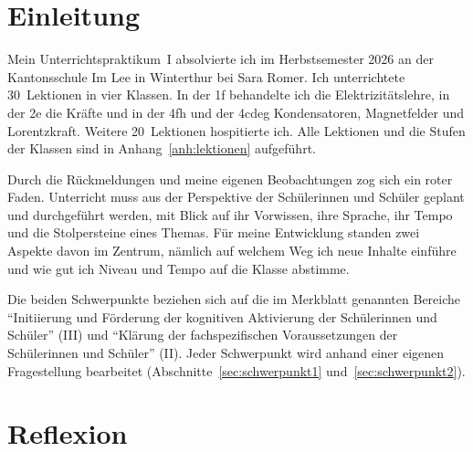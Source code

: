 \documentclass[12pt,a4paper]{article}
\newcommand{\Lehrperson}{Sara Romer}
\begin{document}
\setcounter{page}{2}
\begin{singlespace}
\tableofcontents
\end{singlespace}
\thispagestyle{empty}
\clearpage
{}

\section{Einleitung}

Mein Unterrichtspraktikum~I absolvierte ich im Herbstsemester 2026 an der
Kantonsschule Im Lee in Winterthur bei \Lehrperson. Ich unterrichtete
30~Lektionen in vier Klassen. In der 1f behandelte ich die
Elektrizitätslehre, in der 2e die Kräfte und in der 4fh und der 4cdeg
Kondensatoren, Magnetfelder und Lorentzkraft. Weitere 20~Lektionen hospitierte ich. Alle Lektionen und
die Stufen der Klassen sind in Anhang~\ref{anh:lektionen} aufgeführt.

Durch die Rückmeldungen und meine eigenen Beobachtungen zog sich ein roter
Faden. Unterricht muss aus der Perspektive der Schülerinnen und Schüler geplant
und durchgeführt werden, mit Blick auf ihr Vorwissen, ihre Sprache, ihr Tempo
und die Stolpersteine eines Themas. Für meine Entwicklung standen
zwei Aspekte davon im Zentrum, nämlich auf welchem Weg ich neue Inhalte einführe und wie gut
ich Niveau und Tempo auf die Klasse abstimme.

Die beiden Schwerpunkte beziehen sich auf die im Merkblatt genannten Bereiche
\enquote{Initiierung und Förderung der kognitiven Aktivierung der
Schülerinnen und Schüler} (III) und \enquote{Klärung der fachspezifischen
Voraussetzungen der Schülerinnen und Schüler} (II). Jeder Schwerpunkt wird
anhand einer eigenen Fragestellung bearbeitet (Abschnitte~\ref{sec:schwerpunkt1}
und~\ref{sec:schwerpunkt2}).

\section{Reflexion}
\label{hauptteil-start}
\end{document}
